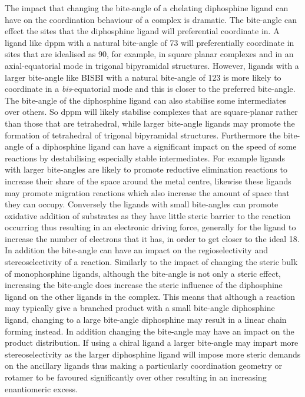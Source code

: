 The impact that changing the bite-angle of a chelating diphosphine ligand can have on the coordination behaviour of a complex is dramatic.  The bite-angle can effect the sites that the diphosphine ligand will preferential coordinate in.  A ligand like dppm with a natural bite-angle of 73\degrees{} will preferentially coordinate in sites that are idealised as 90\degrees{}, for example, \cis{} in square planar complexes and in an axial-equatorial mode in trigonal bipyramidal structures.  However, ligands with a larger bite-angle like BISBI with a natural bite-angle of 123\degrees{} is more likely to coordinate in a \emph{bis}-equatorial mode and this is closer to the preferred bite-angle.  The bite-angle of the diphosphine ligand can also stabilise some intermediates over others.  So dppm will likely stabilise complexes that are square-planar rather than those that are tetrahedral, while larger bite-angle ligands may promote the formation of tetrahedral of trigonal bipyramidal structures.  Furthermore the bite-angle of a diphosphine ligand can have a significant impact on the speed of some reactions by destabilising especially stable intermediates.  For example ligands with larger bite-angles are likely to promote reductive elimination reactions to increase their share of the space around the metal centre, likewise these ligands may promote migration reactions which also increase the amount of space that they can occupy.  Conversely the ligands with small bite-angles can promote oxidative addition of substrates as they have little steric barrier to the reaction occurring thus resulting in an electronic driving force, generally for the ligand to increase the number of electrons that it has, in order to get closer to the ideal 18.  In addition the bite-angle can have an impact on the regioselectivity and stereoselectivity of a reaction.  Similarly to the impact of changing the steric bulk of monophosphine ligands, although the bite-angle is not only a steric effect, increasing the bite-angle does increase the steric influence of the diphosphine ligand on the other ligands in the complex.  This means that although a reaction may typically give a branched product with a small bite-angle diphosphine ligand, changing to a large bite-angle diphosphine may result in a linear chain forming instead.  In addition changing the bite-angle may have an impact on the product distribution.  If using a chiral ligand a larger bite-angle may impart more stereoselectivity as the larger diphosphine ligand will impose more steric demands on the ancillary ligands thus making a particularly coordination geometry or rotamer to be favoured significantly over other resulting in an increasing enantiomeric excess.  

